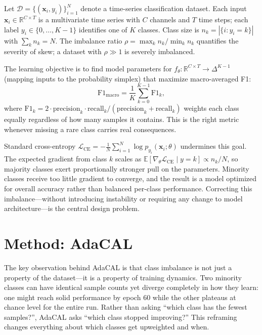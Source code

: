 \documentclass[letterpaper]{article}
\begin{document}
Let $\mathcal{D} = \{(\mathbf{x}_i, y_i)\}_{i=1}^N$ denote a time-series classification dataset. Each input $\mathbf{x}_i \in \mathbb{R}^{C \times T}$ is a multivariate time series with $C$ channels and $T$ time steps; each label $y_i \in \{0, \ldots, K-1\}$ identifies one of $K$ classes. Class size is $n_k = |\{i : y_i = k\}|$ with $\sum_k n_k = N$. The imbalance ratio $\rho = \max_k n_k / \min_k n_k$ quantifies the severity of skew; a dataset with $\rho \gg 1$ is severely imbalanced.

The learning objective is to find model parameters for $f_\theta : \mathbb{R}^{C \times T} \rightarrow \Delta^{K-1}$ (mapping inputs to the probability simplex) that maximize macro-averaged F1:
$$\text{F1}_\text{macro} = \frac{1}{K} \sum_{k=0}^{K-1} \text{F1}_k,$$
where $\text{F1}_k = 2 \cdot \text{precision}_k \cdot \text{recall}_k / (\text{precision}_k + \text{recall}_k)$ weights each class equally regardless of how many samples it contains. This is the right metric whenever missing a rare class carries real consequences.

Standard cross-entropy $\mathcal{L}_\text{CE} = -\frac{1}{N} \sum_{i=1}^N \log p_{y_i}(\mathbf{x}_i; \theta)$ undermines this goal. The expected gradient from class $k$ scales as $\mathbb{E}[\nabla_\theta \mathcal{L}_\text{CE} \mid y = k] \propto n_k / N$, so majority classes exert proportionally stronger pull on the parameters. Minority classes receive too little gradient to converge, and the result is a model optimized for overall accuracy rather than balanced per-class performance. Correcting this imbalance---without introducing instability or requiring any change to model architecture---is the central design problem.

\section{Method: AdaCAL}

The key observation behind AdaCAL is that class imbalance is not just a property of the dataset---it is a property of training dynamics. Two minority classes can have identical sample counts yet diverge completely in how they learn: one might reach solid performance by epoch 60 while the other plateaus at chance level for the entire run. Rather than asking ``which class has the fewest samples?'', AdaCAL asks ``which class stopped improving?'' This reframing changes everything about which classes get upweighted and when.
\end{document}
